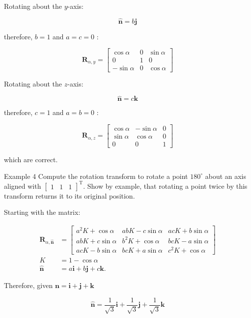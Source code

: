 Rotating about the $y$-axis:

$$
\hat{\mathbf{n}}=b \mathbf{j}
$$

therefore, $b=1$ and $a=c=0$ :

$$
\mathbf{R}_{\alpha, y}=\left[\begin{array}{ccc}
\cos \alpha & 0 & \sin \alpha \\
0 & 1 & 0 \\
-\sin \alpha & 0 & \cos \alpha
\end{array}\right]
$$

Rotating about the $z$-axis:

$$
\hat{\mathbf{n}}=c \mathbf{k}
$$

therefore, $c=1$ and $a=b=0$ :

$$
\mathbf{R}_{\alpha, z}=\left[\begin{array}{ccc}
\cos \alpha & -\sin \alpha & 0 \\
\sin \alpha & \cos \alpha & 0 \\
0 & 0 & 1
\end{array}\right]
$$

which are correct.

Example 4 Compute the rotation transform to rotate a point $180^{\circ}$ about an axis aligned with $\left[\begin{array}{lll}1 & 1 & 1\end{array}\right]^{\mathrm{T}}$. Show by example, that rotating a point twice by this transform returns it to its original position.

Starting with the matrix:

$$
\begin{aligned}
\mathbf{R}_{\alpha, \hat{\mathbf{n}}} & =\left[\begin{array}{ccc}
a^{2} K+\cos \alpha & a b K-c \sin \alpha & a c K+b \sin \alpha \\
a b K+c \sin \alpha & b^{2} K+\cos \alpha & b c K-a \sin \alpha \\
a c K-b \sin \alpha & b c K+a \sin \alpha & c^{2} K+\cos \alpha
\end{array}\right] \\
K & =1-\cos \alpha \\
\hat{\mathbf{n}} & =a \mathbf{i}+b \mathbf{j}+c \mathbf{k} .
\end{aligned}
$$

Therefore, given $\mathbf{n}=\mathbf{i}+\mathbf{j}+\mathbf{k}$

$$
\hat{\mathbf{n}}=\frac{1}{\sqrt{3}} \mathbf{i}+\frac{1}{\sqrt{3}} \mathbf{j}+\frac{1}{\sqrt{3}} \mathbf{k}
$$

